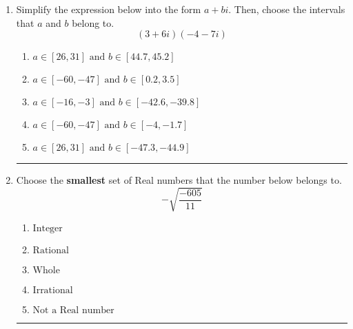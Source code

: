 \documentclass[14pt]{extbook}
\newcommand{\litem}[1]{\item#1\hspace*{-1cm}\rule{\textwidth}{0.4pt}}
\begin{document}
\begin{enumerate}
{\begin{enumerate}[label=\Alph*.]
\end{enumerate} }
\litem{
Simplify the expression below into the form $a+bi$. Then, choose the intervals that $a$ and $b$ belong to.\[ (3 + 6 i)(-4 - 7 i) \]\begin{enumerate}[label=\Alph*.]
\item \( a \in [26, 31] \text{ and } b \in [44.7, 45.2] \)
\item \( a \in [-60, -47] \text{ and } b \in [0.2, 3.5] \)
\item \( a \in [-16, -3] \text{ and } b \in [-42.6, -39.8] \)
\item \( a \in [-60, -47] \text{ and } b \in [-4, -1.7] \)
\item \( a \in [26, 31] \text{ and } b \in [-47.3, -44.9] \)

\end{enumerate} }
\litem{
Choose the \textbf{smallest} set of Real numbers that the number below belongs to.\[ -\sqrt{\frac{-605}{11}} \]\begin{enumerate}[label=\Alph*.]
\item \( \text{Integer} \)
\item \( \text{Rational} \)
\item \( \text{Whole} \)
\item \( \text{Irrational} \)
\item \( \text{Not a Real number} \)

\end{enumerate} }
\end{enumerate}
\end{document}
